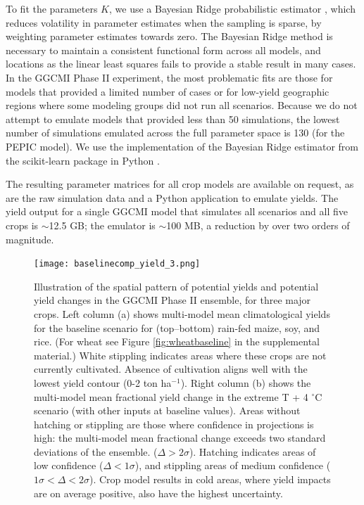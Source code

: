 \documentclass[preprint, 5p, times, twocolumn]{elsarticle}
\begin{document}
To fit the parameters $K$, we use a Bayesian Ridge probabilistic estimator \citep{MacKay91}, which reduces volatility in parameter estimates when the sampling is sparse, by weighting parameter estimates towards zero. The Bayesian Ridge method is necessary to maintain a consistent functional form across all models, and locations as the linear least squares fails to provide a stable result in many cases. In the GGCMI Phase II experiment, the most problematic fits are those for models that provided a limited number of cases or for low-yield geographic regions where some modeling groups did not run all scenarios. Because we do not attempt to emulate models that provided less than 50 simulations, the lowest number of simulations emulated across the full parameter space is 130 (for the PEPIC model). We use the implementation of the Bayesian Ridge estimator from the scikit-learn package in Python \citep{scikit-learn}. 

The resulting parameter matrices for all crop models are available on request, as are the raw simulation data and a Python application to emulate yields. The yield output for a single GGCMI model that simulates all scenarios and all five crops is $\sim$12.5 GB; the emulator is $\sim$100 MB, a reduction by over two orders of magnitude. 

\begin{figure}[!htb]
\centering
   \texttt{[image: baselinecomp\_yield\_3.png]} 
   \caption{Illustration of the spatial pattern of potential yields and potential yield changes in the GGCMI Phase II ensemble, for three major crops. Left column (a) shows multi-model mean climatological yields for the baseline scenario for (top--bottom) rain-fed maize, soy, and rice. (For wheat see Figure \ref{fig:wheatbaseline} in the supplemental material.) White stippling indicates areas where these crops are not currently cultivated. Absence of cultivation aligns well with the lowest yield contour (0-2 ton ha$^{-1}$). Right column (b) shows the multi-model mean fractional yield change in the extreme T + 4 $^{\circ}$C scenario (with other inputs at baseline values). Areas without hatching or stippling are those where confidence in projections is high: the multi-model mean fractional change exceeds two standard deviations of the ensemble. ($\Delta > 2\sigma$). Hatching indicates areas of low confidence ($\Delta < 1 \sigma$), and stippling areas of medium confidence ($1 \sigma < \Delta < 2 \sigma$). Crop model results in cold areas, where yield impacts are on average positive, also have the highest uncertainty.}
   \label{fig:maizesoybaseline}
\end{figure}
\end{document}
